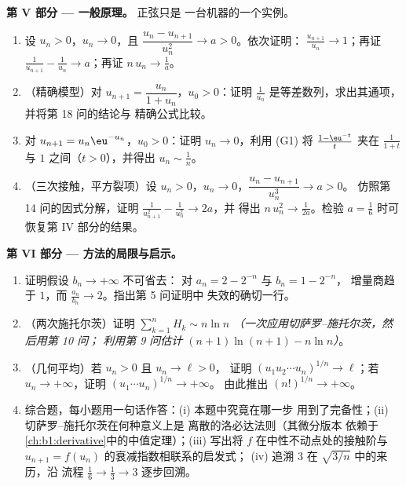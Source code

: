 \begin{problem}[{周末问题 --- 切萨罗--施托尔茨定理，
以及 $u_n \sim \sqrt{3/n}$ 的渐近性，对于 $u_{n+1} = \sin
u_n$}]
\medskip
\noindent\textbf{第 V 部分 --- 一般原理。} 正弦只是
一台机器的一个实例。
\begin{enumerate}[resume]
  \item 设 $u_n > 0$，$u_n \to 0$，且 $\dfrac{u_n -
        u_{n+1}}{u_n^{2}} \to a > 0$。依次证明：
        $\frac{u_{n+1}}{u_n} \to 1$；再证 $\frac{1}{u_{n+1}} -
        \frac{1}{u_n} \to a$；再证 $n\,u_n \to \frac1a$。
  \item （精确模型）对 $u_{n+1} = \dfrac{u_n}{1 + u_n}$，$u_0
        > 0$：证明 $\frac{1}{u_n}$ 是等差数列，求出其通项，
        并将第 18 问的结论与
        精确公式比较。
  \item 对 $u_{n+1} = u_n \eu^{-u_n}$，$u_0 > 0$：证明 $u_n \to
        0$，利用 (G1) 将 $\frac{1 - \eu^{-t}}{t}$ 夹在
        $\frac{1}{1+t}$ 与 $1$ 之间（$t > 0$），并得出 $u_n
        \sim \frac 1n$。
  \item （三次接触，平方裂项）设 $u_n > 0$，$u_n
        \to 0$，$\dfrac{u_n - u_{n+1}}{u_n^{3}} \to a > 0$。
        仿照第 14 问的因式分解，证明
        $\frac{1}{u_{n+1}^2} - \frac{1}{u_n^2} \to 2a$，并
        得出 $n\,u_n^{2} \to \frac{1}{2a}$。检验 $a =
        \frac16$ 时可恢复第 IV 部分的结果。
\end{enumerate}

\medskip
\noindent\textbf{第 VI 部分 --- 方法的局限与启示。}
\begin{enumerate}[resume]
  \item 证明假设 $b_n \to +\infty$ 不可省去：
        对 $a_n = 2 - 2^{-n}$ 与 $b_n = 1 - 2^{-n}$，
        增量商趋于 $1$，而 $\frac{a_n}
        {b_n} \to 2$。指出第 5 问证明中
        失效的确切一行。
  \item （两次施托尔茨）证明 $\sum_{k=1}^{n} H_k \sim n \ln n$
        \emph{（一次应用切萨罗–施托尔茨，然后用第 10 问；
        利用第 9 问估计 $(n+1)\ln(n+1) - n\ln n$）}。
  \item （几何平均）若 $u_n > 0$ 且 $u_n \to \ell > 0$，
        证明 $(u_1 u_2 \cdots u_n)^{1/n} \to \ell$；若 $u_n \to
        +\infty$，证明 $(u_1 \cdots u_n)^{1/n} \to +\infty$。
        由此推出 $(n!)^{1/n} \to +\infty$。
  \item 综合题，每小题用一句话作答：(i) 本题中究竟在哪一步
        用到了完备性；(ii) 切萨罗–施托尔茨在何种意义上是
        离散的洛必达法则（其微分版本
        依赖于
        \cref{ch:b1:derivative}中的中值定理）；(iii) 写出将
        $f$ 在中性不动点处的接触阶与
        $u_{n+1} = f(u_n)$ 的衰减指数相联系的启发式；
        (iv) 追溯 $3$ 在 $\sqrt{3/n}$ 中的来历，沿
        流程 $\frac16 \to \frac13 \to 3$ 逐步回溯。
\end{enumerate}
\end{problem}
